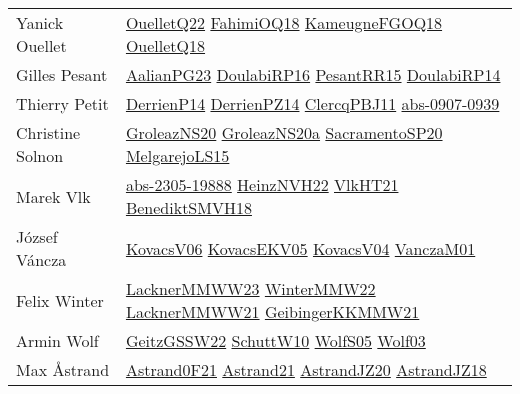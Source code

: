 {\begin{longtable}{p{4cm}p{20cm}}
Yanick Ouellet & \href{papers/OuelletQ22.pdf}{OuelletQ22}\cite{OuelletQ22} \href{articles/FahimiOQ18.pdf}{FahimiOQ18}\cite{FahimiOQ18} \href{papers/KameugneFGOQ18.pdf}{KameugneFGOQ18}\cite{KameugneFGOQ18} \href{papers/OuelletQ18.pdf}{OuelletQ18}\cite{OuelletQ18} \\
Gilles Pesant & \href{papers/AalianPG23.pdf}{AalianPG23}\cite{AalianPG23} \href{}{DoulabiRP16}\cite{DoulabiRP16} \href{papers/PesantRR15.pdf}{PesantRR15}\cite{PesantRR15} \href{papers/DoulabiRP14.pdf}{DoulabiRP14}\cite{DoulabiRP14} \\
Thierry Petit & \href{papers/DerrienP14.pdf}{DerrienP14}\cite{DerrienP14} \href{papers/DerrienPZ14.pdf}{DerrienPZ14}\cite{DerrienPZ14} \href{papers/ClercqPBJ11.pdf}{ClercqPBJ11}\cite{ClercqPBJ11} \href{articles/abs-0907-0939.pdf}{abs-0907-0939}\cite{abs-0907-0939} \\
Christine Solnon & \href{papers/GroleazNS20.pdf}{GroleazNS20}\cite{GroleazNS20} \href{}{GroleazNS20a}\cite{GroleazNS20a} \href{articles/SacramentoSP20.pdf}{SacramentoSP20}\cite{SacramentoSP20} \href{papers/MelgarejoLS15.pdf}{MelgarejoLS15}\cite{MelgarejoLS15} \\
Marek Vlk & \href{articles/abs-2305-19888.pdf}{abs-2305-19888}\cite{abs-2305-19888} \href{articles/HeinzNVH22.pdf}{HeinzNVH22}\cite{HeinzNVH22} \href{articles/VlkHT21.pdf}{VlkHT21}\cite{VlkHT21} \href{papers/BenediktSMVH18.pdf}{BenediktSMVH18}\cite{BenediktSMVH18} \\
J{\'{o}}zsef V{\'{a}}ncza & \href{papers/KovacsV06.pdf}{KovacsV06}\cite{KovacsV06} \href{papers/KovacsEKV05.pdf}{KovacsEKV05}\cite{KovacsEKV05} \href{papers/KovacsV04.pdf}{KovacsV04}\cite{KovacsV04} \href{papers/VanczaM01.pdf}{VanczaM01}\cite{VanczaM01} \\
Felix Winter & \href{articles/LacknerMMWW23.pdf}{LacknerMMWW23}\cite{LacknerMMWW23} \href{papers/WinterMMW22.pdf}{WinterMMW22}\cite{WinterMMW22} \href{papers/LacknerMMWW21.pdf}{LacknerMMWW21}\cite{LacknerMMWW21} \href{papers/GeibingerKKMMW21.pdf}{GeibingerKKMMW21}\cite{GeibingerKKMMW21} \\
Armin Wolf & \href{papers/GeitzGSSW22.pdf}{GeitzGSSW22}\cite{GeitzGSSW22} \href{papers/SchuttW10.pdf}{SchuttW10}\cite{SchuttW10} \href{papers/WolfS05.pdf}{WolfS05}\cite{WolfS05} \href{papers/Wolf03.pdf}{Wolf03}\cite{Wolf03} \\
Max {\AA}strand & \href{papers/Astrand0F21.pdf}{Astrand0F21}\cite{Astrand0F21} \href{}{Astrand21}\cite{Astrand21} \href{articles/AstrandJZ20.pdf}{AstrandJZ20}\cite{AstrandJZ20} \href{papers/AstrandJZ18.pdf}{AstrandJZ18}\cite{AstrandJZ18} \\

\end{longtable}}
